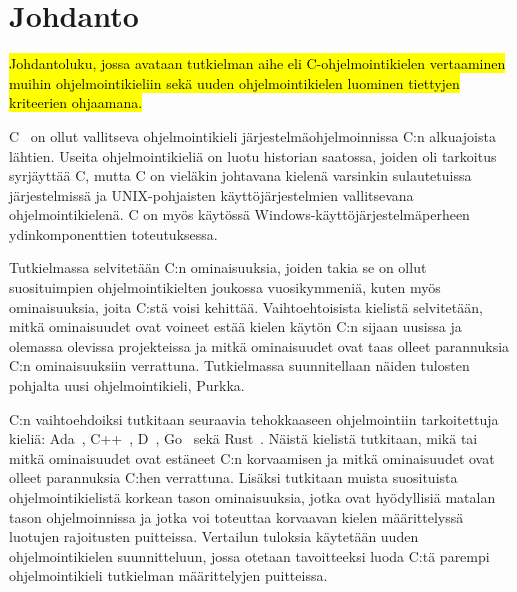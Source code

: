 \section{Johdanto}

\hl{Johdantoluku, jossa avataan tutkielman aihe eli C-ohjelmointikielen
vertaaminen muihin ohjelmointikieliin sekä uuden ohjelmointikielen luominen
tiettyjen kriteerien ohjaamana.}

C~\citep{C18} on ollut vallitseva ohjelmointikieli järjestelmäohjelmoinnissa
C:n alkuajoista lähtien. Useita ohjelmointikieliä on luotu historian saatossa,
joiden oli tarkoitus syrjäyttää C, mutta C on vieläkin johtavana kielenä
varsinkin sulautetuissa järjestelmissä ja UNIX-pohjaisten käyttöjärjestelmien
vallitsevana ohjelmointikielenä. C on myös käytössä
Windows-käyttöjärjestelmäperheen ydinkomponenttien toteutuksessa.

Tutkielmassa selvitetään C:n ominaisuuksia, joiden takia se on ollut
suosituimpien ohjelmointikielten joukossa vuosikymmeniä, kuten myös
ominaisuuksia, joita C:stä voisi kehittää. Vaihtoehtoisista kielistä
selvitetään, mitkä ominaisuudet ovat voineet estää kielen käytön C:n sijaan
uusissa ja olemassa olevissa projekteissa ja mitkä ominaisuudet ovat taas
olleet parannuksia C:n ominaisuuksiin verrattuna. Tutkielmassa suunnitellaan
näiden tulosten pohjalta uusi ohjelmointikieli, Purkka.

C:n vaihtoehdoiksi tutkitaan seuraavia tehokkaaseen ohjelmointiin tarkoitettuja
kieliä: Ada~\citep{ADA12}, C++~\citep{CPP17}, D~\citep{D}, Go~\citep{golang}
sekä Rust~\citep{rust}. Näistä kielistä tutkitaan, mikä tai mitkä ominaisuudet
ovat estäneet C:n korvaamisen ja mitkä ominaisuudet ovat olleet parannuksia
C:hen verrattuna. Lisäksi tutkitaan muista suosituista ohjelmointikielistä
korkean tason ominaisuuksia, jotka ovat hyödyllisiä matalan tason
ohjelmoinnissa ja jotka voi toteuttaa korvaavan kielen määrittelyssä luotujen
rajoitusten puitteissa. Vertailun tuloksia käytetään uuden ohjelmointikielen
suunnitteluun, jossa otetaan tavoitteeksi luoda C:tä parempi ohjelmointikieli
tutkielman määrittelyjen puitteissa.


